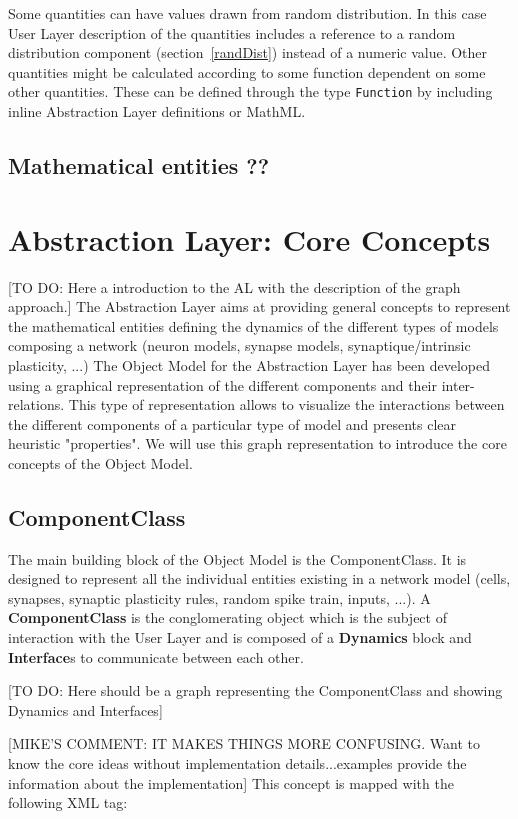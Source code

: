 \documentclass{article}
\newcommand{\ComponentClass}{{\bf{ComponentClass}}\xspace}
\newcommand{\Dynamics}{{\bf{Dynamics}}\xspace}
\newcommand{\Interfaces}{{\bf{Interface}}s\xspace}
\begin{document}
Some quantities can have values drawn from random distribution. In this case
User Layer description of the quantities includes a reference to a random
distribution component (section~\ref{randDist}) instead of a numeric value.
Other quantities might be calculated according to some function dependent on
some other quantities. These can be defined through the type {\tt Function} by
including inline Abstraction Layer definitions or MathML.

\subsection{Mathematical entities ??}


\section{Abstraction Layer: Core Concepts }
\label{AbstractionL}

[TO DO: Here a introduction to the AL with the description of the graph approach.]
The Abstraction Layer aims at providing general concepts to represent the mathematical entities defining the dynamics of the different types of models composing a network (neuron models, synapse models, synaptique/intrinsic plasticity, ...)
The Object Model for the Abstraction Layer has been developed using a graphical representation of the different components and their inter-relations.
This type of representation allows to visualize the interactions between the different components of a particular type of model and presents clear heuristic "properties".
We will use this graph representation to introduce the core concepts of the Object Model.

\subsection{ComponentClass}
The main building block of the Object Model is the ComponentClass. 
It is designed to represent all the individual entities existing in a network model (cells, synapses, synaptic plasticity rules, random spike train, inputs, ...). 
A \ComponentClass is the conglomerating object which is the subject of interaction with the User Layer and is composed of a \Dynamics block and \Interfaces to communicate between each other.

[TO DO: Here should be a graph representing the ComponentClass and showing Dynamics and Interfaces]

[MIKE'S COMMENT: IT MAKES THINGS MORE CONFUSING. Want to know the core ideas without implementation details...examples provide the information about the implementation]
This concept is mapped with the following XML tag: 
\end{document}
